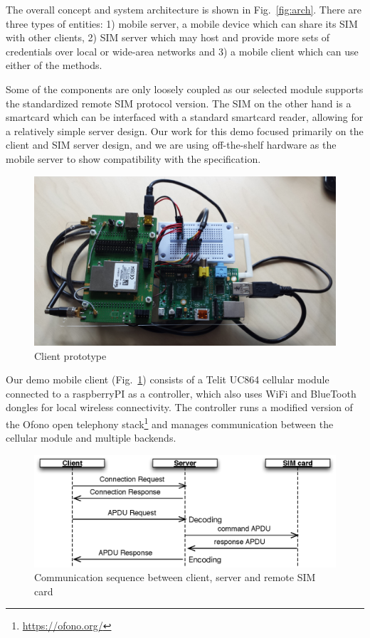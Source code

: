 \documentclass{sig-alternate-10pt}
\begin{document}
The overall concept and system architecture is shown in Fig.~\ref{fig:arch}. There are three types of entities: 1) mobile server, a mobile device which can share its SIM with other clients, 2) SIM server which may host and provide more sets of credentials over local or wide-area networks and 3) a mobile client which can use either of the methods.

Some of the components are only loosely coupled as our selected module supports the standardized remote SIM protocol version. The SIM on the other hand is a smartcard which can be interfaced with a standard smartcard reader, allowing for a relatively simple server design. Our work for this demo focused primarily on the client and SIM server design, and we are using off-the-shelf hardware as the mobile server to show compatibility with the specification.

\begin{figure}[t!]
\centering
\includegraphics[width=0.9\columnwidth]{figs/client}
\vspace{-2mm}
\caption{Client prototype}
\label{fig:client}
\vspace{-3mm}
\end{figure}

Our demo mobile client (Fig.~\ref{fig:client}) consists of a Telit UC864 cellular module connected to a raspberryPI as a controller, which also uses WiFi and BlueTooth dongles for local wireless connectivity. The controller runs a modified version of the Ofono open telephony stack\footnote{\url{https://ofono.org/}} and manages communication between the cellular module and multiple backends.

\begin{figure}[t!]
\centering
\includegraphics[width=0.9\columnwidth]{figs/sequence}
\vspace{-2mm}
\caption{Communication sequence between client, server and remote SIM card}
\label{fig:sequence}
\vspace{-5mm}
\end{figure}
\end{document}

